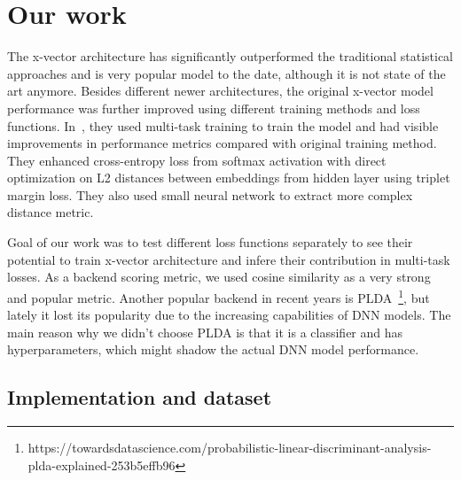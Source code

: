 \section{Our work}
The x-vector architecture has significantly outperformed the traditional statistical approaches and is very popular model to the date, although it is not state of the art anymore. Besides different newer architectures, the original x-vector model performance was further improved using different training methods and loss functions. In~\cite{x_vectors_triplet}, they used multi-task training to train the model and had visible improvements in performance metrics compared with original training method. They enhanced cross-entropy loss from softmax activation with direct optimization on L2 distances between embeddings from hidden layer using triplet margin loss. They also used small neural network to extract more complex distance metric.

\medskip
Goal of our work was to test different loss functions separately to see their potential to train x-vector architecture and infere their contribution in multi-task losses. As a backend scoring metric, we used cosine similarity as a very strong and popular metric. Another popular backend in recent years is PLDA~\footnote{https://towardsdatascience.com/probabilistic-linear-discriminant-analysis-plda-explained-253b5effb96}, but lately it lost its popularity due to the increasing capabilities of DNN models. The main reason why we didn't choose PLDA is that it is a classifier and has hyperparameters, which might shadow the actual DNN model performance. 

\subsection*{Implementation and dataset}

